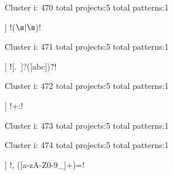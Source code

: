 Cluster i: 470
total projects:5
total patterns:1
\begin{multicols}{1}
\begin{description}[noitemsep,topsep=0pt]
\item [[5] ] \cverb!(\(\s|\s\))!
\end{description}
\end{multicols}







Cluster i: 471
total projects:5
total patterns:1
\begin{multicols}{1}
\begin{description}[noitemsep,topsep=0pt]
\item [[5] ] \cverb![.~]?([abc])\.?!
\end{description}
\end{multicols}







Cluster i: 472
total projects:5
total patterns:1
\begin{multicols}{1}
\begin{description}[noitemsep,topsep=0pt]
\item [[5] ] \cverb!\w+\s*:\s*\w!
\end{description}
\end{multicols}







Cluster i: 473
total projects:5
total patterns:1
\begin{multicols}{1}
\begin{description}[noitemsep,topsep=0pt]
\item [[5] ] \cverb!([a-zA-Z-]+):\s*$!
\end{description}
\end{multicols}







Cluster i: 474
total projects:5
total patterns:1
\begin{multicols}{1}
\begin{description}[noitemsep,topsep=0pt]
\item [[5] ] \cverb!, ([a-zA-Z0-9_]+)=!
\end{description}
\end{multicols}







